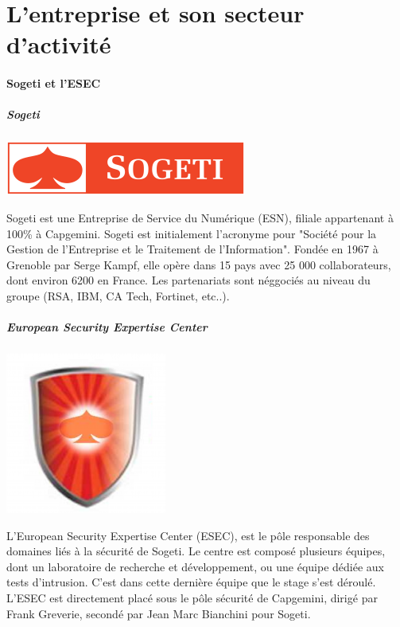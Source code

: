 \section*{L'entreprise et son secteur d'activité}
\paragraph{Sogeti et l'ESEC}
\subparagraph{Sogeti}
\begin{center}
\includegraphics[scale=0.7]{sogeti.png}
\end{center}
Sogeti est une Entreprise de Service du Numérique (ESN), filiale appartenant
à 100\% à Capgemini. Sogeti est initialement l'acronyme pour "Société pour la Gestion de
l'Entreprise et le Traitement de l'Information". Fondée en 1967 à Grenoble par Serge Kampf, elle opère
dans 15 pays avec 25 000 collaborateurs, dont environ 6200 en France. Les partenariats sont néggociés au niveau
du groupe (RSA, IBM, CA Tech, Fortinet, etc..).

\subparagraph{European Security Expertise Center}
\begin{center}
\includegraphics[scale=0.4]{esec.png}
\end{center}
L'European Security Expertise Center (ESEC), est le pôle responsable des domaines
liés à la sécurité de Sogeti. Le centre est composé plusieurs équipes, dont un
laboratoire de recherche et développement, ou une équipe dédiée aux tests d'intrusion.
C'est dans cette dernière équipe que le stage s'est déroulé.
L'ESEC est directement placé sous le pôle sécurité de Capgemini, dirigé par Frank
Greverie, secondé par Jean Marc Bianchini pour Sogeti.

